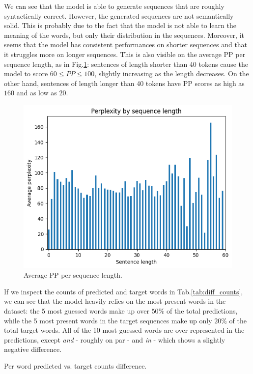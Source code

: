 We can see that the model is able to generate sequences that are roughly syntactically correct. However, the generated sequences are not semantically solid. This is probably due to the fact that the model is not able to learn the meaning of the words, but only their distribution in the sequences. Moreover, it seems that the model has consistent performances on shorter sequences and that it struggles more on longer sequences. This is also visible on the average PP per sequence length, as in Fig.\ref{fig:avg_pp_per_seq_len}: sentences of length shorter than 40 tokens cause the model to score $60 \le PP \le 100$, slightly increasing as the length decreases. On the other hand, sentences of length longer than 40 tokens have PP scores as high as $160$ and as low as $20$.
\begin{figure}
    \centering
    \includegraphics[width=.5\textwidth]{./assets/images/ppl_by_len}
    \caption{Average PP per sequence length.}
    \label{fig:avg_pp_per_seq_len}
\end{figure}

If we inspect the counts of predicted and target words in Tab.\ref{tab:diff_counts}, we can see that the model heavily relies on the most present words in the dataset: the 5 most guessed words make up over $50\%$ of the total predictions, while the 5 most present words in the target sequences make up only $20\%$ of the total target words. All of the 10 most guessed words are over-represented in the predictions, except \emph{and} - roughly on par - and \emph{in} - which shows a slightly negative difference.

\begin{table}
    
    \caption{Per word predicted vs. target counts difference.}
    \label{tab:diff_counts}
\end{table}